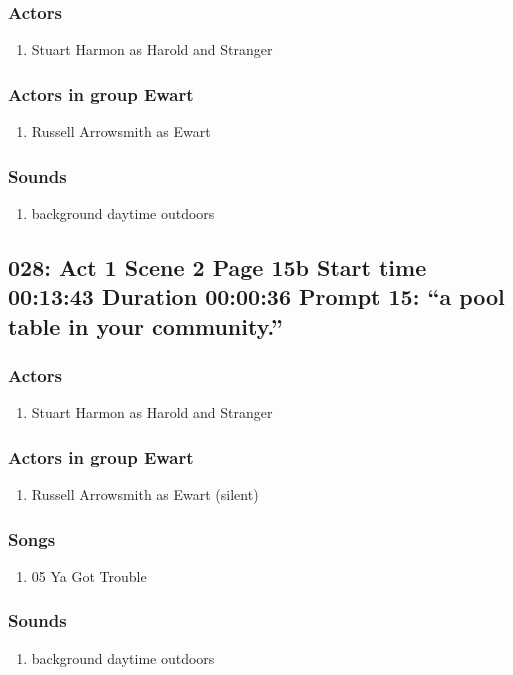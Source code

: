 \subsubsection{Actors}
\begin{enumerate}
\item Stuart Harmon as Harold and Stranger
\end{enumerate}
\subsubsection{Actors in group Ewart}
\begin{enumerate}
\item Russell Arrowsmith as Ewart
\end{enumerate}

\subsubsection{Sounds}
\begin{enumerate}
\item background daytime outdoors
\end{enumerate}
\subsection{028: Act 1 Scene 2 Page 15b Start time 00:13:43 Duration 00:00:36 Prompt 15: ``a pool table in your community.''}

\subsubsection{Actors}
\begin{enumerate}
\item Stuart Harmon as Harold and Stranger
\end{enumerate}
\subsubsection{Actors in group Ewart}
\begin{enumerate}
\item Russell Arrowsmith as Ewart (silent)
\end{enumerate}

\subsubsection{Songs}
\begin{enumerate}
\item 05 Ya Got Trouble
\end{enumerate}\subsubsection{Sounds}
\begin{enumerate}
\item background daytime outdoors
\end{enumerate}
